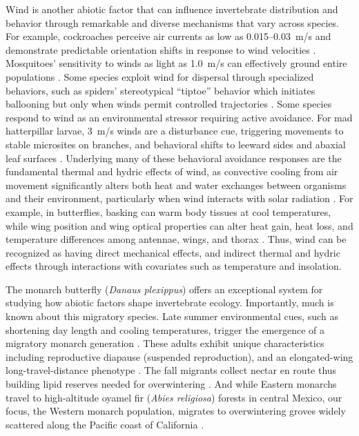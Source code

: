 \documentclass[insects,article,submit,pdftex,moreauthors]{Definitions/mdpi}
\begin{document}
Wind is another abiotic factor that can influence invertebrate distribution and behavior through remarkable and diverse mechanisms that vary across species. For example, cockroaches perceive air currents as low as 0.015--0.03~m/s and demonstrate predictable orientation shifts in response to wind velocities \cite{bellSearchAnemotacticOrientation1979}. Mosquitoes' sensitivity to winds as light as 1.0~m/s can effectively ground entire populations \cite{bidlingmayerEffectWindVelocity1995}. Some species exploit wind for dispersal through specialized behaviors, such as spiders' stereotypical ``tiptoe'' behavior which initiates ballooning but only when winds permit controlled trajectories \cite{bonteHeritabilitySpiderBallooning2007}. Some species respond to wind as an environmental stressor requiring active avoidance. For mad hatterpillar larvae, 3~m/s winds are a disturbance cue, triggering movements to stable microsites on branches, and behavioral shifts to leeward sides and abaxial leaf surfaces \cite{leonardExposureWindAlters2016}. Underlying many of these behavioral avoidance responses are the fundamental thermal and hydric effects of wind, as convective cooling from air movement significantly alters both heat and water exchanges between organisms and their environment, particularly when wind interacts with solar radiation \cite{riddellWindNicheThermal2025}. For example, in butterflies, basking can warm body tissues at cool temperatures, while wing position and wing optical properties can alter heat gain, heat loss, and temperature differences among antennae, wings, and thorax \cite{munroClimateStrongPredictor2019,tsaiPhysicalBehavioralAdaptations2020,krishnaAirTemperatureDrives2021}. Thus, wind can be recognized as having direct mechanical effects, and indirect thermal and hydric effects through interactions with covariates such as temperature and insolation.

The monarch butterfly (\textit{Danaus plexippus}) offers an exceptional system for studying how abiotic factors shape invertebrate ecology. Importantly, much is known about this migratory species. Late summer environmental cues, such as shortening day length and cooling temperatures, trigger the emergence of a migratory monarch generation \cite{reppertDemystifyingMonarchButterfly2018,goehringEffectsPhotoperiodTemperature2002,hermanJuvenileHormoneRegulation2001,barkerEffectPhotoperiodTemperature1976}. These adults exhibit unique characteristics including reproductive diapause (suspended reproduction), and an elongated-wing long-travel-distance phenotype \cite{barkerEffectPhotoperiodTemperature1976,yangIntrapopulationVariationNatal2016,tuskesOverwinteringEcologyMonarch1978}. The fall migrants collect nectar en route thus building lipid reserves needed for overwintering \cite{hermanJuvenileHormoneRegulation2001,chaplinEnergyReservesMetabolic1982,Urquhart1978Autumnal}. And while Eastern monarchs travel to high-altitude oyamel fir (\textit{Abies religiosa}) forests in central Mexico, our focus, the Western monarch population, migrates to overwintering groves widely scattered along the Pacific coast of California \cite{browerUnderstandingMisunderstandingMigration1995,Urquhart1978Autumnal}.
\end{document}
